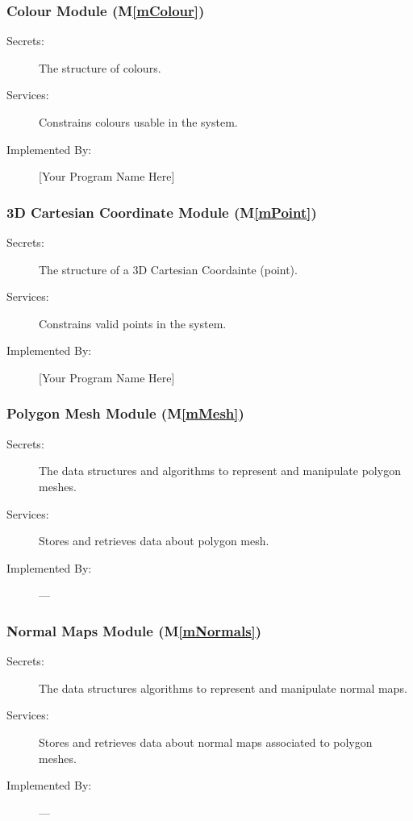 \documentclass[12pt, titlepage]{article}
\newcommand{\mref}[1]{M\ref{#1}}
\begin{document}
\subsubsection{Colour Module (\mref{mColour})}
\begin{description}
	\item[Secrets:]The structure of colours.
	\item[Services:]Constrains colours usable in the system.
	\item[Implemented By:] [Your Program Name Here]
\end{description}

\subsubsection{3D Cartesian Coordinate Module (\mref{mPoint})}
\begin{description}
	\item[Secrets:]The structure of a 3D Cartesian Coordainte (point).
	\item[Services:]Constrains valid points in the system.
	\item[Implemented By:] [Your Program Name Here]
\end{description}

\subsubsection{Polygon Mesh Module (\mref{mMesh})}
\begin{description}
	\item[Secrets:]The data structures and algorithms to represent and 
	manipulate polygon meshes.
	\item[Services:]Stores and retrieves data about polygon mesh.
	\item[Implemented By:] ---
\end{description}

\subsubsection{Normal Maps Module (\mref{mNormals})}
\begin{description}
	\item[Secrets:]The data structures algorithms to represent and manipulate 
	normal maps.
	\item[Services:]Stores and retrieves data about normal maps associated to 
	polygon meshes.
	\item[Implemented By:] ---
\end{description}
\end{document}
